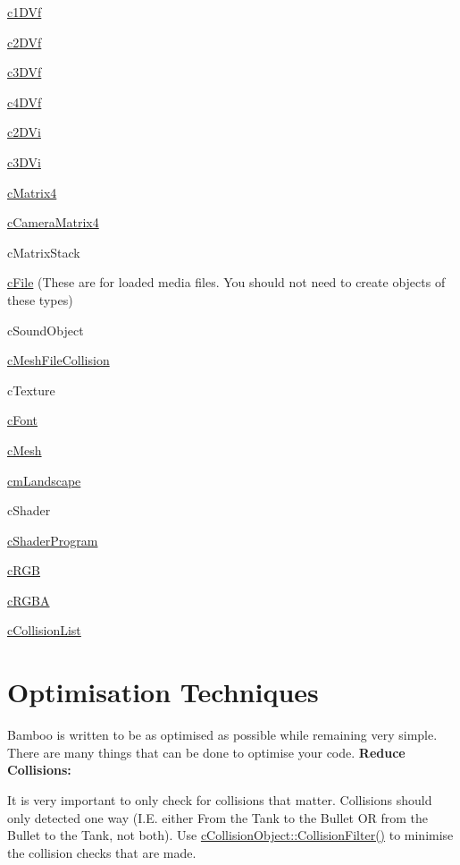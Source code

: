 \begin{DoxyItemize}
\item \hyperlink{classc1_d_vf}{c1DVf}
\item \hyperlink{classc2_d_vf}{c2DVf}
\item \hyperlink{classc3_d_vf}{c3DVf}
\item \hyperlink{classc4_d_vf}{c4DVf}
\item \hyperlink{classc2_d_vi}{c2DVi}
\item \hyperlink{classc3_d_vi}{c3DVi}
\item \hyperlink{classc_matrix4}{cMatrix4}
\item \hyperlink{classc_camera_matrix4}{cCameraMatrix4}
\item cMatrixStack
\item \hyperlink{classc_file}{cFile} (These are for loaded media files. You should not need to create objects of these types)
\begin{DoxyItemize}
\item cSoundObject
\item \hyperlink{classc_mesh_file_collision}{cMeshFileCollision}
\item cTexture
\item \hyperlink{classc_font}{cFont}
\item \hyperlink{classc_mesh}{cMesh}
\item \hyperlink{classcm_landscape}{cmLandscape}
\item cShader
\item \hyperlink{classc_shader_program}{cShaderProgram}
\end{DoxyItemize}
\item \hyperlink{classc_r_g_b}{cRGB}
\item \hyperlink{classc_r_g_b_a}{cRGBA}
\item \hyperlink{classc_collision_list}{cCollisionList}
\end{DoxyItemize}\hypertarget{_reference_lists_OptimisationTechniques}{}\section{Optimisation Techniques}\label{_reference_lists_OptimisationTechniques}
Bamboo is written to be as optimised as possible while remaining very simple. There are many things that can be done to optimise your code. {\bfseries Reduce Collisions:} \par
 It is very important to only check for collisions that matter. Collisions should only detected one way (I.E. either From the Tank to the Bullet OR from the Bullet to the Tank, not both). Use \hyperlink{classc_collision_object_a1490cdf75c8037049bfa7891aa8756b7}{cCollisionObject::CollisionFilter()} to minimise the collision checks that are made. \par
